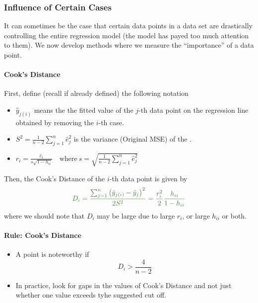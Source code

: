 \documentclass[11pt]{article}
\begin{document}
\subsubsection{Influence of Certain Cases}
It can sometimes be the case that certain data points in a data set are drastically controlling the entire regression model (the model has payed too much attention to them). We now develop methods where we measure the ``importance'' of a data point.

\paragraph{Cook's Distance} First, define (recall if already defined) the following notation
\begin{itemize}
    \item $\hat{{y}}_{j(i)}$ means the the fitted value of the $j$-th data point on the regression line obtained by removing the $i$-th case. 
    \item $S^2 = \frac{1}{n-2} \sum_{j=1}^n \hat{e}_j^2$ is the variance (Original MSE) of the \color{Thistle}{total regression model}. \color{black}
    \item $r_{i}=\frac{\hat{e}_{i}}{s \sqrt{1-h_{i i}}}\quad \text{where}~ s=\sqrt{\frac{1}{n-2} \sum_{j=1}^{n} \hat{e}_{j}^{2}}$
\end{itemize}
Then, the Cook's Distance of the $i$-th data point is given by
\begin{equation*}
    \color{OliveGreen}
    D_{i}=\frac{\sum_{j=1}^{n}\left(\hat{y}_{j(i)}-\hat{y}_{j}\right)^{2}}{2 S^{2}} = \frac{r_{i}^{2}}{2} \frac{h_{i i}}{1-h_{i i}}
\end{equation*}
where we should note that $D_i$ may be large due to large $r_i$, or large $h_{ii}$ or both.

\paragraph{Rule: Cook's Distance} 
\begin{itemize}
    \item A point is noteworthy if
        \begin{equation*}
            D_i > \frac{4}{n-2}
        \end{equation*}
    \item In practice, look for gaps in the values of Cook's Distance and not just whether one value exceeds tyhe suggested cut off.
\end{itemize}
\end{document}

